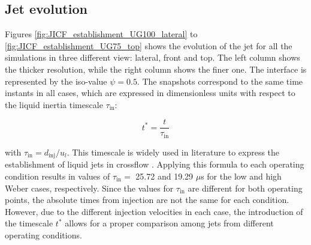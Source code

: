 \subsection{Jet evolution}
\label{subsec:ch5_jet_evolution}





Figures \ref{fig:JICF_establishment_UG100_lateral} to \ref{fig:JICF_establishment_UG75_top} shows the evolution of the jet for all the simulations in three different view: lateral, front and top. The left column shows the thicker resolution, while the right column shows the finer one. The interface is represented by the iso-value $\psi = 0.5$. The snapshots correspond to the same time instants in all cases, which are expressed in dimensionless units with respect to the liquid inertia timescale $\tau_\mathrm{in}$:

\begin{equation}
\label{eq:t_dimensionless_with_tau_in}
t^* = \frac{t}{\tau_\mathrm{in}}
\end{equation}

with $\tau_\mathrm{in} = d_\mathrm{inj}/u_l$. This timescale is widely used in literature to express the establishment of liquid jets in crossflow . Applying this formula to each operating condition results in values of $\tau_\mathrm{in} = $ 25.72 and 19.29 $\mu$s for the low and high Weber cases, respectively. Since the values for $\tau_\mathrm{in}$ are different for both operating points, the absolute times from injection are not the same for each condition. However, due to the different injection velocities in each case, the introduction of the timescale $t^*$ allows for a proper comparison among jets from different operating conditions.


